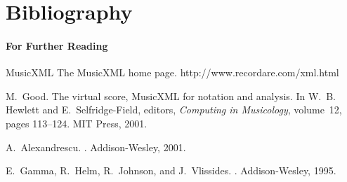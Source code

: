 \documentclass{beamer}
\begin{document}
\chapter{Bibliography}
\begin{frame}
	\frametitle{For Further Reading}

\begin{thebibliography}{Alexandrescu, 2001}

{\scriptsize

MusicXML
\newblock The MusicXML home page.
\newblock http://www.recordare.com/xml.html

M.~Good.
\newblock The virtual score, MusicXML for notation and analysis.
\newblock In W.~B. Hewlett and E.~Selfridge-Field, editors, {\em Computing in
  Musicology}, volume~12, pages 113--124. MIT Press, 2001.

A.~Alexandrescu.
.
\newblock Addison-Wesley, 2001.

E.~Gamma, R.~Helm, R.~Johnson, and J.~Vlissides.
.
\newblock Addison-Wesley, 1995.

}
\end{thebibliography}

\end{frame}
\end{document}
